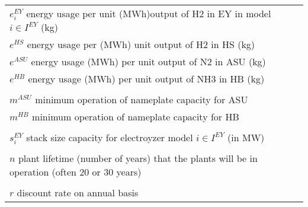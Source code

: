 \documentclass[12 pt]{article}
\begin{document}
\begin{tabular}{ll}
\\
$e^{EY}_{i}$ energy usage per unit (MWh)output of H2 in EY in model $i \in I^{EY}$ (kg)\\
$e^{HS}$ energy usage per (MWh) unit output of H2 in HS (kg) \\
$e^{ASU}$ energy usage (MWh) per unit output of N2 in ASU (kg)\\
$e^{HB}$ energy usage (MWh) per unit output of NH3 in HB (kg) \\
\\
$m^{ASU}$ minimum operation of nameplate capacity for ASU\\
$m^{HB}$ minimum operation of nameplate capacity for HB\\
\\
$s^{EY}_{i}$ stack size capacity for electroyzer model $i \in I^{EY}$ (in MW)\\
\\
$n$ plant lifetime (number of years) that the plants will be in operation (often 20 or 30 years)\\
\\
$r$ discount rate on annual basis\\
\end{tabular} 
\end{document}
